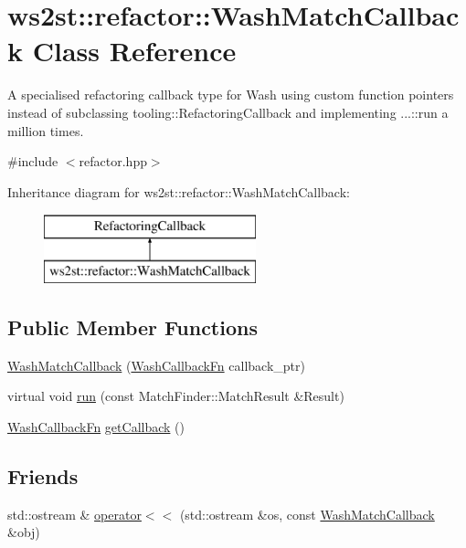 \hypertarget{classws2st_1_1refactor_1_1WashMatchCallback}{}\section{ws2st\+:\+:refactor\+:\+:Wash\+Match\+Callback Class Reference}
\label{classws2st_1_1refactor_1_1WashMatchCallback}


A specialised refactoring callback type for Wash using custom function pointers instead of subclassing tooling\+::\+Refactoring\+Callback and implementing ...\+::run a million times.  




{\ttfamily \#include $<$refactor.\+hpp$>$}

Inheritance diagram for ws2st\+:\+:refactor\+:\+:Wash\+Match\+Callback\+:\begin{figure}[H]
\begin{center}
\leavevmode
\includegraphics[height=2.000000cm]{classws2st_1_1refactor_1_1WashMatchCallback}
\end{center}
\end{figure}
\subsection*{Public Member Functions}
\begin{DoxyCompactItemize}
\item 
\mbox{\hyperlink{classws2st_1_1refactor_1_1WashMatchCallback_a92cc5cf8562d6d0df12547a5df116bec}{Wash\+Match\+Callback}} (\mbox{\hyperlink{namespacews2st_a682dfda40d8282c7e579a7b826a7d861}{Wash\+Callback\+Fn}} callback\+\_\+ptr)
\item 
virtual void \mbox{\hyperlink{classws2st_1_1refactor_1_1WashMatchCallback_a1712bb28c2728b43b5ca0f2d682382a6}{run}} (const Match\+Finder\+::\+Match\+Result \&Result)
\item 
\mbox{\hyperlink{namespacews2st_a682dfda40d8282c7e579a7b826a7d861}{Wash\+Callback\+Fn}} \mbox{\hyperlink{classws2st_1_1refactor_1_1WashMatchCallback_a91f255d66c7a62daa588b7f6910b5b50}{get\+Callback}} ()
\end{DoxyCompactItemize}
\subsection*{Friends}
\begin{DoxyCompactItemize}
\item 
std\+::ostream \& \mbox{\hyperlink{classws2st_1_1refactor_1_1WashMatchCallback_a0038f6cb22cb01fa32430f4857862513}{operator$<$$<$}} (std\+::ostream \&os, const \mbox{\hyperlink{classws2st_1_1refactor_1_1WashMatchCallback}{Wash\+Match\+Callback}} \&obj)
\end{DoxyCompactItemize}


